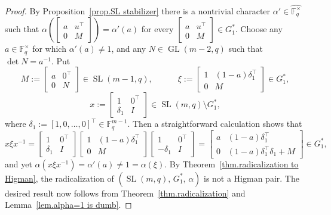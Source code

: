 \documentclass[11pt]{article}
\theoremstyle{definition}
\numberwithin{equation}{section}
\begin{document}
\begin{proof}
By Proposition~\ref{prop.SL stabilizer} there is a nontrivial character $\alpha' \in \widehat{ \mathbb{F}_q^\times}$ such that $\alpha\left(\begin{bmatrix}
a&u^\top\\0&M
\end{bmatrix}\right)
=\alpha'(a)$ for every $\begin{bmatrix}
a&u^\top\\0&M
\end{bmatrix} \in G_1^*$.
Choose any $a \in \mathbb{F}_q^\times$ for which $\alpha'(a) \neq 1$, and any $N \in \operatorname{GL}(m-2,q)$ such that $\det N = a^{-1}$.
Put
\[ M := \begin{bmatrix} a & 0^\top \\ 0 & N \end{bmatrix} \in \operatorname{SL}(m-1,q), \qquad \quad
\xi := \begin{bmatrix} 1 & (1-a)\delta_1^\top \\ 0 & M \end{bmatrix} \in G_1^*, \]
\[
x := \begin{bmatrix} 1 & 0^\top \\ \delta_1 & I \end{bmatrix} \in \operatorname{SL}(m,q) \setminus G_1^*,
\]
where $\delta_1 := [1,0,\dotsc,0]^\top \in \mathbb{F}_q^{m-1}$.
Then a straightforward calculation shows that
\[ x\xi x^{-1} 
=\begin{bmatrix} 1 & 0^\top \\ \delta_1 & I \end{bmatrix}
\begin{bmatrix} 1 & (1-a)\delta_1^\top \\ 0 & M \end{bmatrix}
\begin{bmatrix} 1 & 0^\top \\ -\delta_1 & I \end{bmatrix}
=\begin{bmatrix} a & (1-a)\delta_1^\top \\ 0 & (1-a)\delta_1^\top \delta_1 + M \end{bmatrix}
\in G_1^*,
\]
and yet $\alpha(x\xi x^{-1}) = \alpha'(a) \neq 1 = \alpha(\xi)$.
By Theorem~\ref{thm.radicalization to Higman}, the radicalization of $(\operatorname{SL}(m,q),\, G_1^*,\, \alpha)$ is not a Higman pair.
The desired result now follows from Theorem~\ref{thm.radicalization} and Lemma~\ref{lem.alpha=1 is dumb}.
\end{proof}
\end{document}

